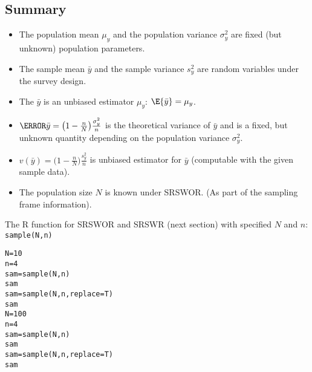 \subsection*{Summary}
\begin{Regular}{}
      \begin{itemize}
            \item The population mean $ \mu_y $ and the population variance
                  $ \sigma_y^2 $ are fixed (but unknown) population parameters.
            \item The sample mean $ \bar{y} $ and the sample variance $ s_y^2 $
                  are random variables under the survey design.
            \item The $ \bar{y} $ is an unbiased estimator $ \mu_y $: $ \E{\bar{y}}=\mu_y $.
            \item $ \V{\bar{y}}=\bigl(1-\frac{n}{N}\bigr)\frac{\sigma_y^2}{n} $
                  is the theoretical variance of $ \bar{y} $ and is a fixed, but unknown
                  quantity depending on the population variance $ \sigma_y^2 $.
            \item $ v(\bar{y})=\bigl(1-\frac{n}{N}\bigr)\frac{s_y^2}{n} $
                  is unbiased estimator for $ \bar{y} $ (computable with the given sample data).
            \item The population size $ N $ is known under SRSWOR\@. (As part of the sampling
                  frame information).
      \end{itemize}
\end{Regular}
\begin{Example}{}
      The R function for SRSWOR and SRSWR (next section) with
      specified $N$ and $n$: \texttt{sample(N,n)}
      \begin{verbatim}
N=10
n=4
sam=sample(N,n)
sam
sam=sample(N,n,replace=T)
sam
N=100
n=4
sam=sample(N,n)
sam
sam=sample(N,n,replace=T)
sam
\end{verbatim}
\end{Example}
